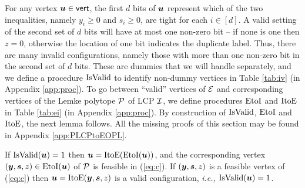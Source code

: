 For any vertex $\mbox{\boldmath $u$}\in \operatorname{\mathsf{vert}}$, the first $d$ bits of $\mbox{\boldmath $u$}$ represent
which of the two inequalities, namely $y_i\ge 0$ and $s_i\ge 0$, are tight for
each $i \in [d]$. A valid setting of the second set of $d$ bits will have 
at most one non-zero bit -- if none is one then $z=0$, otherwise the location of one bit indicates the duplicate label. 
Thus, there are many invalid configurations, namely
those with more than one non-zero bit in the second set of $d$ bits. 
These are dummies that we will handle separately, and we define a procedure 
$\mbox{IsValid}$ to identify non-dummy vertices in Table \ref{tab:iv} (in Appendix \ref{app:proc}). 
To go between ``valid'' vertices of $\mbox{${\mathcal E}$}$ and corresponding vertices of the Lemke polytope
$\mbox{${\mathcal P}$}$ of LCP $\mbox{${\mathcal I}$}$, we define procedures $\mbox{EtoI}$ and $\mbox{ItoE}$ in Table
\ref{tab:ei} (in Appendix \ref{app:proc}).  
By construction of $\mbox{IsValid}$, $\mbox{EtoI}$ and $\mbox{ItoE}$, the next lemma follows.
All the missing proofs of this section may be found in Appendix \ref{app:PLCPtoEOPL}.

\begin{lemma}\label{lem:vert}
If $\mbox{IsValid}(\mbox{\boldmath $u$})=1$ then $\mbox{\boldmath $u$}=\mbox{ItoE}(\mbox{EtoI}(\mbox{\boldmath $u$}))$, and the corresponding vertex $(\mbox{\boldmath $y$},\mbox{\boldmath $s$},z)\in \mbox{EtoI}(\mbox{\boldmath $u$})$ of $\mbox{${\mathcal P}$}$ is feasible in (\ref{eq:c}). If $(\mbox{\boldmath $y$},\mbox{\boldmath $s$},z)$ is a feasible vertex of (\ref{eq:c}) then $\mbox{\boldmath $u$}=\mbox{ItoE}(\mbox{\boldmath $y$},\mbox{\boldmath $s$},z)$ is a valid configuration, {\em i.e.,} $\mbox{IsValid}(\mbox{\boldmath $u$})=1$.
\end{lemma}

